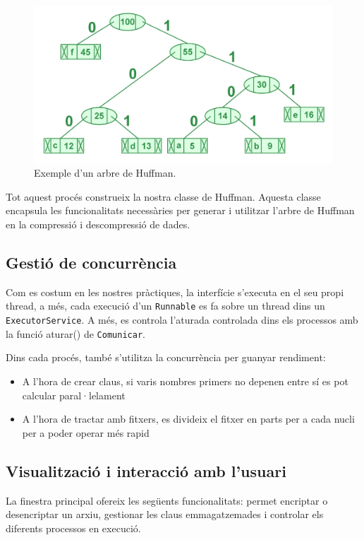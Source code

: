 \documentclass{ieeetj}
\begin{document}
\begin{figure}[h]
    \centering
\includegraphics[width=\linewidth]{png/huffman.png}
    \caption{Exemple d'un arbre de Huffman.}
    \label{fig:enter-label}
\end{figure}
Tot aquest procés construeix la nostra classe de Huffman. Aquesta classe encapsula les funcionalitats necessàries per generar i utilitzar l'arbre de Huffman en la compressió i descompressió de dades.

\subsection{Gestió de concurrència} 
Com es costum en les nostres pràctiques, la interfície s'executa en el seu propi thread, a més, cada execució d'un \texttt{Runnable} es fa sobre un thread dins un \texttt{ExecutorService}.
A més, es controla l'aturada controlada dins els processos amb la funció aturar() de \texttt{Comunicar}.

Dins cada procés, també s'utilitza la concurrència per guanyar rendiment:
\begin{itemize}
    \item A l'hora de crear claus, si varis nombres primers no depenen entre sí es pot calcular paral·lelament
    \item A l'hora de tractar amb fitxers, es divideix el fitxer en parts per a cada nucli per a poder operar més rapid
\end{itemize}

\subsection{Visualització i interacció amb l'usuari}
La finestra principal ofereix les següents funcionalitats: permet encriptar o desencriptar un arxiu, gestionar les claus emmagatzemades i controlar els diferents processos en execució.
\end{document}
